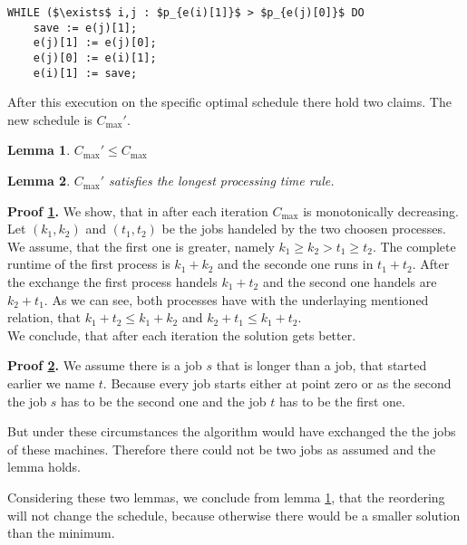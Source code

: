 \documentclass[11pt,a4paper,ngerman]{article}
\newtheorem{lemma}{\bfseries Lemma}
\begin{document}
\begin{description}
        \begin{lstlisting}
WHILE ($\exists$ i,j : $p_{e(i)[1]}$ > $p_{e(j)[0]}$ DO
    save := e(j)[1];
    e(j)[1] := e(j)[0];
    e(j)[0] := e(i)[1];
    e(i)[1] := save;
        \end{lstlisting} 
\pagebreak
        After this execution on the specific optimal schedule there hold two claims. The
        new schedule is $C_{\max}'$.
        \begin{lemma} \label{apx:ueb3:cmax}
            {\itshape
            $C_{\max}' \leq C_{\max}$
            }
        \end{lemma}
        \begin{lemma} \label{apx:ueb3:latest}
            {\itshape
            $C_{\max}'$ satisfies the longest processing time rule.
            }
        \end{lemma}
        \begin{description}
            \item{\bfseries\rmfamily Proof \ref{apx:ueb3:cmax}. }
                We show, that in after each iteration $C_{\max}$ is
                monotonically decreasing. Let $(k_1,k_2)$ and $(t_1,t_2)$ be the
                jobs handeled by the two choosen processes. We assume, that the first
                one is greater, namely $k_1 \geq k_2 > t_1 \geq t_2$.
                The complete runtime of the first process is $k_1 + k_2$ and the seconde
                one runs in $t_1 + t_2$.
                After the exchange the first process handels $k_1+t_2$ and the second
                one handels are $k_2+t_1$. As we can see, both processes have with the
                underlaying mentioned relation, that $k_1+t_2 \leq k_1 + k_2$ and 
                $k_2+t_1 \leq k_1+t_2$.\\

                We conclude, that after each iteration the solution gets better.

            \item{\bfseries\rmfamily Proof \ref{apx:ueb3:latest}. }
                We assume there is a job $s$ that is longer than a job, that started
                earlier we name $t$. Because every job starts either at point zero or as the second
                the job $s$ has to be the second one and the job $t$ has to be the first one.
                
                But under these circumstances the algorithm would have exchanged the
                the jobs of these machines. Therefore there could not be two jobs as assumed
                and the lemma holds.
        \end{description}
        Considering these two lemmas, we conclude from lemma \ref{apx:ueb3:cmax}, that
        the reordering will not change the schedule, because otherwise there would be
        a smaller solution than the minimum.


\end{description}
\end{document}
